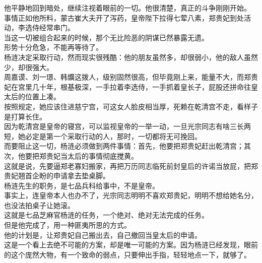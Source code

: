 \begin{multicols}{\theparacolNo}
他平静地回到暗处，继续注视着眼前的一切。他很清楚，真正的斗争刚刚开始。\\

事情正如他所料，蒙古崔大夫开了泻药，皇帝陛下拉得七荤八素，郑贵妃到处活动，李选侍经常串门。\\

当这一切被组合起来的时候，那个无比险恶的阴谋已然暴露无遗。\\

形势十分危急，不能再等待了。\\

杨涟决定采取行动，然而现实很残酷：他的朋友虽然多，却很弱小，他的敌人虽然少，却很强大。\\

周嘉谟、刘一璟、韩爌这拨人，级别固然很高，但毕竟刚上来，能量不大，而郑贵妃在宫里几十年，根基极深，一手拉着李选侍，一手抓着皇长子，屁股还拼命往皇太后的位置上凑。\\

按照规定，她应该住进慈宁宫，可这女人脸皮相当厚，死赖在乾清宫不走，看样子是打算长住。\\

因为乾清宫是皇帝的寝宫，可以监视皇帝的一举一动，一旦光宗同志有啥三长两短，她必定是第一个采取行动的人，那时，一切都将无可挽回。\\

而要阻止这一切，杨涟必须做到两件事情：首先，他要把郑贵妃赶出乾清宫；其次，他要把郑贵妃当太后的事情彻底搅黄。\\

这就是说，先要逼郑老寡妇搬家，再把万历同志临死前封皇后的许诺当放屁，把郑贵妃翘首企盼的申请拿去垫桌脚。\\

杨涟先生的职务，是七品兵科给事中，不是皇帝。\\

事实上，连皇帝本人也办不了，光宗同志明明不喜欢郑贵妃，明明不想给她名分，也没法拍桌子让她滚。\\

这就是七品芝麻官杨涟的任务，一个绝对、绝对无法完成的任务。\\

但是他完成了，用一种匪夷所思的方式。\\

他的计划是，让郑贵妃自己搬出去，自己撤回当皇太后的申请。\\

这是一个看上去绝不可能的方案，却是唯一可能的方案。因为杨涟已经发现，眼前的这个庞然大物，有一个致命的弱点，只要伸出手指，轻轻地点一下，就够了。\\


\end{multicols}
